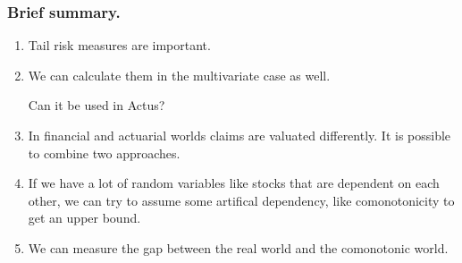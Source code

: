 \documentclass{beamer}
\begin{document}
\begin{frame}
\frametitle{Brief summary.}
\begin{enumerate}
	\item Tail risk measures are important.
	\item We can calculate them in the multivariate case as well. 
	
	Can it  be used in Actus?
	\item In financial and actuarial worlds claims are valuated differently. It is possible to combine two approaches.
	\item If we have a lot of random variables like stocks that are dependent on each other, we can try to assume some artifical dependency, like comonotonicity to get an upper bound.
	\item We can measure the gap between the real world and the comonotonic world.
\end{enumerate}
\end{frame}
\end{document}
